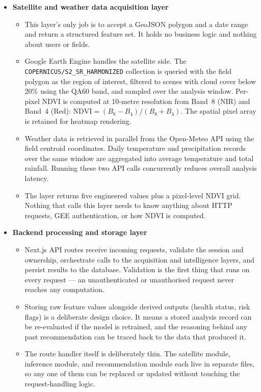 \begin{itemize}
  \item \textbf{Satellite and weather data acquisition layer}
    \begin{itemize}
      \item[-] This layer's only job is to accept a GeoJSON polygon and a date range and return a structured feature set. It holds no business logic and nothing about users or fields.
      \item[-] Google Earth Engine handles the satellite side. The \texttt{COPERNICUS/S2\_SR\_HARMONIZED} collection is queried with the field polygon as the region of interest, filtered to scenes with cloud cover below 20\% using the QA60 band, and sampled over the analysis window. Per-pixel NDVI is computed at 10-metre resolution from Band~8 (NIR) and Band~4 (Red): $\text{NDVI} = (B_8 - B_4) / (B_8 + B_4)$. The spatial pixel array is retained for heatmap rendering. \citep{gorelick2017, esa2023}
      \item[-] Weather data is retrieved in parallel from the Open-Meteo API using the field centroid coordinates. Daily temperature and precipitation records over the same window are aggregated into average temperature and total rainfall. Running these two API calls concurrently reduces overall analysis latency. \citep{openmeteo2023}
      \item[-] The layer returns five engineered values plus a pixel-level NDVI grid. Nothing that calls this layer needs to know anything about HTTP requests, GEE authentication, or how NDVI is computed.
    \end{itemize}

  \item \textbf{Backend processing and storage layer}
    \begin{itemize}
      \item[-] Next.js API routes receive incoming requests, validate the session and ownership, orchestrate calls to the acquisition and intelligence layers, and persist results to the database. Validation is the first thing that runs on every request — an unauthenticated or unauthorised request never reaches any computation.
      \item[-] Storing raw feature values alongside derived outputs (health status, risk flags) is a deliberate design choice. It means a stored analysis record can be re-evaluated if the model is retrained, and the reasoning behind any past recommendation can be traced back to the data that produced it. \citep{prisma2023}
      \item[-] The route handler itself is deliberately thin. The satellite module, inference module, and recommendation module each live in separate files, so any one of them can be replaced or updated without touching the request-handling logic.
    \end{itemize}


\end{itemize}
